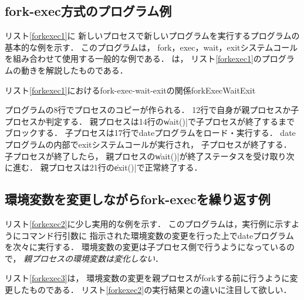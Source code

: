 \subsection{fork-exec方式のプログラム例}
リスト\ref{forkexec1}に
新しいプロセスで新しいプログラムを実行するプログラムの基本的な例を示す．
このプログラムは，
fork，exec，wait，exitシステムコールを組み合わせて使用する一般的な例である．
は，
リスト\ref{forkexec1}のプログラムの動きを解説したものである．

  
  
    {リスト\ref{forkexec1}におけるfork-exec-wait-exitの関係}{forkExecWaitExit}

プログラムの8行でプロセスのコピーが作られる．
12行で自身が親プロセスか子プロセスか判定する．
親プロセスは14行の\|wait()|で子プロセスが終了するまでブロックする．
子プロセスは17行でdateプログラムをロード・実行する．
dateプログラムの内部でexitシステムコールが実行され，
子プロセスが終了する．
子プロセスが終了したら，
親プロセスの\|wait()|が終了ステータスを受け取り次に進む．
親プロセスは21行の\|exit()|で正常終了する．

\subsection{環境変数を変更しながらfork-execを繰り返す例}
リスト\ref{forkexec2}に少し実用的な例を示す．
このプログラムは，実行例に示すようにコマンド行引数に
指示された環境変数の変更を行った上でdateプログラムを次々に実行する．
環境変数の変更は子プロセス側で行うようになっているので，
\emph{親プロセスの環境変数は変化しない}．



リスト\ref{forkexec3}は，
環境変数の変更を親プロセスがforkする前に行うように変更したものである．
リスト\ref{forkexec2}の実行結果との違いに注目して欲しい．



